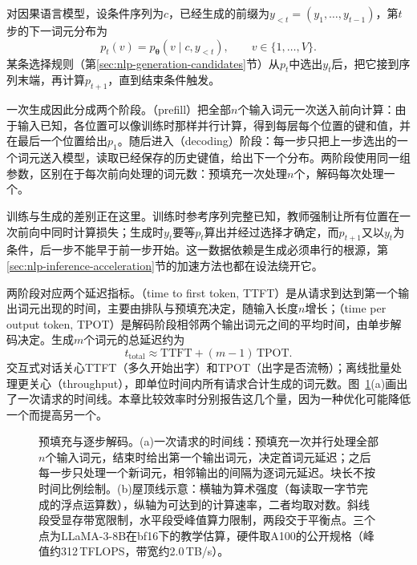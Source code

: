 对因果语言模型，设条件序列为$c$，已经生成的前缀为$y_{<t}=(y_1,\ldots,y_{t-1})$，第$t$步的下一词元分布为
\begin{equation}
 p_t(v)=p_{\bm{\theta}}(v\mid c,y_{<t}),\qquad v\in\{1,\ldots,V\}.
 \label{eq:nlp-inference-next-token}
\end{equation}
某条选择规则（第\ref{sec:nlp-generation-candidates}节）从$p_t$中选出$y_t$后，把它接到序列末端，再计算$p_{t+1}$，直到结束条件触发。

一次生成因此分成两个阶段。（prefill）把全部$n$个输入词元一次送入前向计算：由于输入已知，各位置可以像训练时那样并行计算，得到每层每个位置的键和值，并在最后一个位置给出$p_1$。随后进入（decoding）阶段：每一步只把上一步选出的一个词元送入模型，读取已经保存的历史键值，给出下一个分布。两阶段使用同一组参数，区别在于每次前向处理的词元数：预填充一次处理$n$个，解码每次处理一个。

训练与生成的差别正在这里。训练时参考序列完整已知，教师强制让所有位置在一次前向中同时计算损失；生成时$y_t$要等$p_t$算出并经过选择才确定，而$p_{t+1}$又以$y_t$为条件，后一步不能早于前一步开始。这一数据依赖是生成必须串行的根源，第\ref{sec:nlp-inference-acceleration}节的加速方法也都在设法绕开它。

两阶段对应两个延迟指标。（time to first token, TTFT）是从请求到达到第一个输出词元出现的时间，主要由排队与预填充决定，随输入长度$n$增长；（time per output token, TPOT）是解码阶段相邻两个输出词元之间的平均时间，由单步解码决定。生成$m$个词元的总延迟约为
\begin{equation}
 t_{\mathrm{total}}\approx \mathrm{TTFT}+(m-1)\,\mathrm{TPOT}.
 \label{eq:nlp-inference-latency}
\end{equation}
交互式对话关心TTFT（多久开始出字）和TPOT（出字是否流畅）；离线批量处理更关心（throughput），即单位时间内所有请求合计生成的词元数。图~\ref{fig:nlp-inference-prefill-decode}(a)画出了一次请求的时间线。本章比较效率时分别报告这几个量，因为一种优化可能降低一个而提高另一个。

\begin{figure}[htbp]
  \centering
  
  \caption{预填充与逐步解码。(a)一次请求的时间线：预填充一次并行处理全部$n$个输入词元，结束时给出第一个输出词元，决定首词元延迟；之后每一步只处理一个新词元，相邻输出的间隔为逐词元延迟。块长不按时间比例绘制。(b)屋顶线示意：横轴为算术强度（每读取一字节完成的浮点运算数），纵轴为可达到的计算速率，二者均取对数。斜线段受显存带宽限制，水平段受峰值算力限制，两段交于平衡点。三个点为LLaMA-3-8B在bf16下的教学估算，硬件取A100的公开规格（峰值约312\,TFLOPS，带宽约2.0\,TB/s）。}
  \label{fig:nlp-inference-prefill-decode}
\end{figure}

